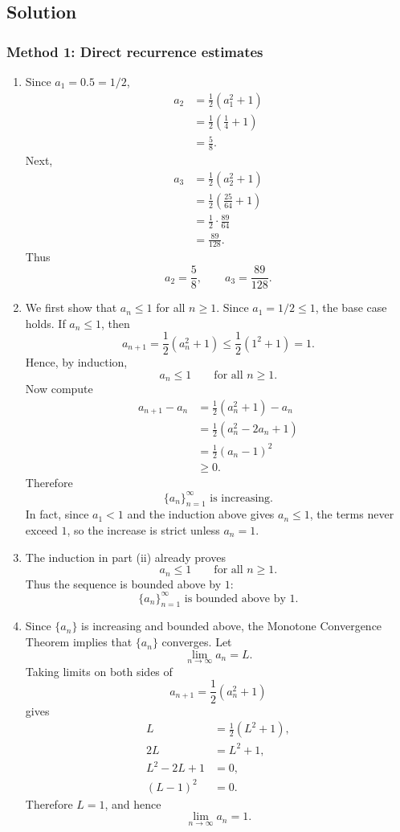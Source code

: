 \documentclass[12pt]{article}
\begin{document}
\newpage
\subsection{Solution}

\subsubsection{Method 1: Direct recurrence estimates}

\begin{enumerate}[label=(\roman*)]
\item Since $a_1=0.5=1/2$,
\begin{align*}
a_2
&=\frac12\left(a_1^2+1\right) \\
&=\frac12\left(\frac14+1\right) \\
&=\frac58.
\end{align*}
Next,
\begin{align*}
a_3
&=\frac12\left(a_2^2+1\right) \\
&=\frac12\left(\frac{25}{64}+1\right) \\
&=\frac12\cdot \frac{89}{64} \\
&=\frac{89}{128}.
\end{align*}
Thus
\[
\boxed{a_2=\frac58,
\qquad a_3=\frac{89}{128}.}
\]

\item We first show that $a_n\leq 1$ for all $n\geq 1$. Since $a_1=1/2\leq 1$, the base case holds. If $a_n\leq 1$, then
\[
a_{n+1}=\frac12(a_n^2+1)\leq \frac12(1^2+1)=1.
\]
Hence, by induction,
\[
a_n\leq 1\qquad\text{for all }n\geq 1.
\]
Now compute
\begin{align*}
a_{n+1}-a_n
&=\frac12(a_n^2+1)-a_n \\
&=\frac12(a_n^2-2a_n+1) \\
&=\frac12(a_n-1)^2 \\
&\geq 0.
\end{align*}
Therefore
\[
\boxed{\{a_n\}_{n=1}^{\infty}\text{ is increasing.}}
\]
In fact, since $a_1<1$ and the induction above gives $a_n\leq 1$, the terms never exceed $1$, so the increase is strict unless $a_n=1$.

\item The induction in part (ii) already proves
\[
a_n\leq 1\qquad\text{for all }n\geq 1.
\]
Thus the sequence is bounded above by $1$:
\[
\boxed{\{a_n\}_{n=1}^{\infty}\text{ is bounded above by }1.}
\]

\item Since $\{a_n\}$ is increasing and bounded above, the Monotone Convergence Theorem implies that $\{a_n\}$ converges. Let
\[
\lim_{n\to\infty}a_n=L.
\]
Taking limits on both sides of
\[
a_{n+1}=\frac12(a_n^2+1)
\]
gives
\begin{align*}
L&=\frac12(L^2+1), \\
2L&=L^2+1, \\
L^2-2L+1&=0, \\
(L-1)^2&=0.
\end{align*}
Therefore $L=1$, and hence
\[
\boxed{\displaystyle \lim_{n\to\infty}a_n=1.}
\]
\end{enumerate}
\end{document}
